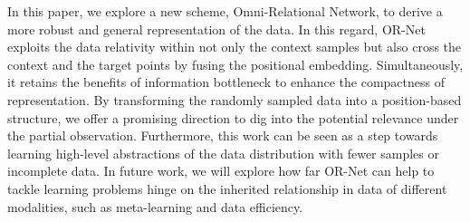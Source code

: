 \documentclass[sigconf]{acmart} %
\begin{document}
In this paper, we explore a new scheme, Omni-Relational Network, to derive a more robust and general representation of the data. In this regard, OR-Net exploits the data relativity within not only the context samples but also cross the context and the target points by fusing the positional embedding. Simultaneously, it retains the benefits of information bottleneck to enhance the compactness of representation.
By transforming the randomly sampled data into a position-based structure, we offer a promising direction to dig into the potential relevance under the partial observation.
Furthermore, this work can be seen as a step towards learning high-level abstractions of the data distribution with fewer samples or incomplete data.
In future work, we will explore how far OR-Net can help to tackle learning problems hinge on the inherited relationship in data of different modalities, such as meta-learning and data efficiency.









{


}
\end{document}
